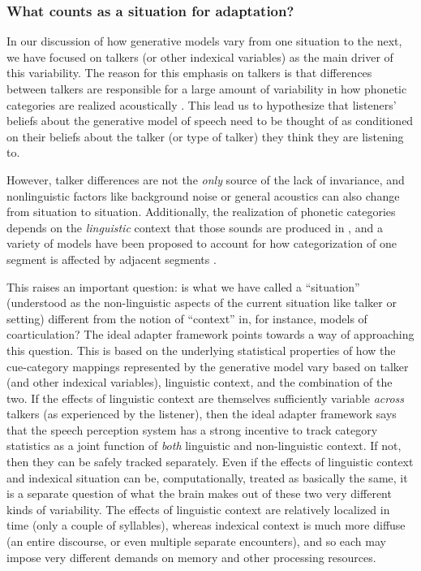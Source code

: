 \subsubsection{What counts as a situation for adaptation?}
\label{sec:index-situ-vers}

In our discussion of how generative models vary from one situation to the next, we have focused on talkers (or other indexical variables) as the main driver of this variability.  The reason for this emphasis on talkers is that differences between talkers are responsible for a large amount of variability in how phonetic categories are realized acoustically \autocite[among others]{Allen2003,Hillenbrand1995,McMurray2011a,Newman2001}.  This lead us to hypothesize that listeners' beliefs about the generative model of speech need to be thought of as conditioned on their beliefs about the talker (or type of talker) they think they are listening to.  

However, talker differences are not the \emph{only} source of the lack of invariance, and nonlinguistic factors like background noise or general acoustics can also change from situation to situation.  Additionally, the realization of phonetic categories depends on the \emph{linguistic} context that those sounds are produced in \autocite{Liberman1967}, and a variety of models have been proposed to account for how categorization of one segment is affected by adjacent segments \autocite{Massaro1987,Nearey1997,Nearey1986,Oden1978,Smits2001a,Sonderegger2010}.

This raises an important question: is what we have called a ``situation'' (understood as the non-linguistic aspects of the current situation like talker or setting) different from the notion of ``context'' in, for instance, models of coarticulation?  The ideal adapter framework points towards a way of approaching this question.  This is based on the underlying statistical properties of how the cue-category mappings represented by the generative model vary based on talker (and other indexical variables), linguistic context, and the combination of the two.  If the effects of linguistic context are themselves sufficiently variable \emph{across} talkers (as experienced by the listener), then the ideal adapter framework says that the speech perception system has a strong incentive to track category statistics as a joint function of \emph{both} linguistic and non-linguistic context.  If not, then they can be safely tracked separately.  
Even if the effects of linguistic context and indexical situation can be, computationally, treated as basically the same, it is a separate question of what the brain makes out of these two very different kinds of variability.  The effects of linguistic context are relatively localized in time (only a couple of syllables), whereas indexical context is much more diffuse (an entire discourse, or even multiple separate encounters), and so each may impose very different demands on memory and other processing resources.

